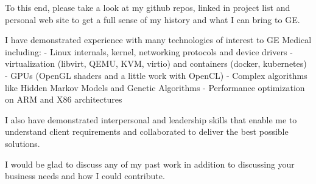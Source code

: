 \documentclass[11pt, letterpaper]{awesome-cv}
\begin{document}
\begin{cvletter}
To this end, please take a look at my github repos, linked in project list and personal web site to get a full sense of my history and what I can bring to GE.

I have demonstrated experience with many technologies of interest to GE Medical including:
- Linux internals, kernel, networking protocols and device drivers
- virtualization (libvirt, QEMU, KVM, virtio) and containers (docker, kubernetes)
- GPUs (OpenGL shaders and a little work with OpenCL)
- Complex algorithms like Hidden Markov Models and Genetic Algorithms
- Performance optimization on ARM and X86 architectures






I also have demonstrated interpersonal and leadership skills that enable me to
  understand client requirements and collaborated to deliver the best possible
  solutions.




I would be glad to discuss any of my past work in addition to
  discussing your business needs and how I could contribute.

\end{cvletter}


\makeletterclosing
\end{document}
